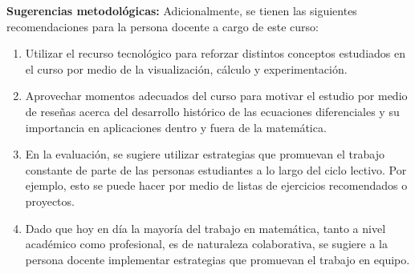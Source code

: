 \begin{refsection}
\textbf{Sugerencias metodológicas:} Adicionalmente, se tienen las siguientes recomendaciones para la persona docente a cargo de este curso:
\begin{enumerate}
    \item Utilizar el recurso tecnológico para reforzar distintos conceptos estudiados en el curso por medio de la visualización, cálculo y experimentación.
    \item Aprovechar momentos adecuados del curso para motivar el estudio por medio de reseñas acerca del desarrollo histórico de las ecuaciones diferenciales y su importancia en aplicaciones dentro y fuera de la matemática. 
    \item En la evaluación, se sugiere utilizar estrategias que promuevan el trabajo constante de parte de las personas estudiantes a lo largo del ciclo lectivo. Por ejemplo, esto se puede hacer por medio de listas de ejercicios recomendados o proyectos.
    \item Dado que hoy en día la mayoría del trabajo en matemática, tanto a nivel académico como profesional, es de naturaleza colaborativa, se sugiere a la persona docente implementar estrategias que promuevan el trabajo en equipo.
\end{enumerate}


\nocite{Cod89}
\nocite{Cod55}
\nocite{Bra93}
\nocite{VE21}
\nocite{Mag23}
\nocite{Per01}
\nocite{Tes01}

\printbibliography[heading=subbibliography,section=\the\value{refsection}]
\end{refsection}
